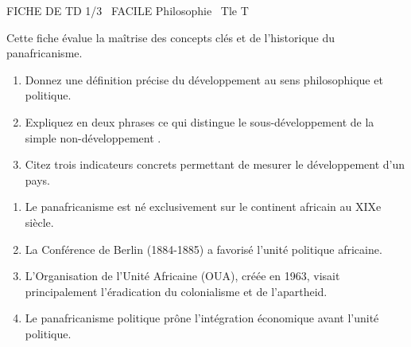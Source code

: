 \documentclass[11pt]{article}
\begin{document}
\begin{tcolorbox}[enhanced,colback=popink,colframe=popink,arc=10pt,boxrule=0pt,left=12pt,right=12pt,top=9pt,bottom=9pt]
{\color{white}\popxbold\small FICHE DE TD 1/3 \textbullet\ FACILE \hfill Philosophie \textbullet\ Tle T\par}
\end{tcolorbox}
\vspace{4pt}
Cette fiche évalue la maîtrise des concepts clés et de l'historique du panafricanisme.

\begin{exercice}
\begin{enumerate}
    \item Donnez une définition précise du \og développement \fg au sens philosophique et politique.
    \item Expliquez en deux phrases ce qui distingue le \og sous-développement \fg de la simple \og non-développement \fg.
    \item Citez trois indicateurs concrets permettant de mesurer le développement d'un pays.
\end{enumerate}
\end{exercice}

\begin{exercice}
\begin{enumerate}
    \item Le panafricanisme est né exclusivement sur le continent africain au XIXe siècle.
    \item La Conférence de Berlin (1884-1885) a favorisé l'unité politique africaine.
    \item L'Organisation de l'Unité Africaine (OUA), créée en 1963, visait principalement l'éradication du colonialisme et de l'apartheid.
    \item Le \og panafricanisme politique \fg prône l'intégration économique avant l'unité politique.
\end{enumerate}
\end{exercice}
\end{document}
